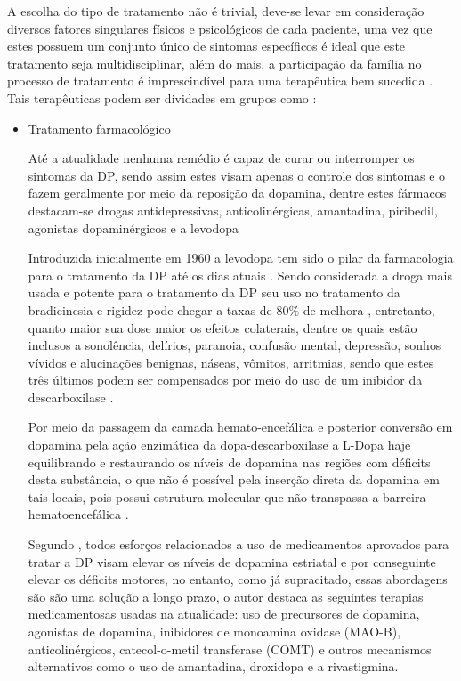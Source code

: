 \documentclass[
	12pt,				%
	openany,			%
	oneside,			%
	a4paper,			%
	english,			%
	french,				%
	spanish,			%
	brazil				%
	]{abntex2}
\begin{document}
A escolha do tipo de tratamento não é trivial, deve-se levar em consideração diversos fatores singulares físicos e psicológicos de cada paciente, uma vez que estes possuem um conjunto único de sintomas específicos é ideal que este tratamento seja multidisciplinar, além do mais, a participação da família no processo de tratamento é imprescindível para uma terapêutica bem sucedida \cite{saito2011}. Tais terapêuticas podem ser dividades em grupos como \cite{coelho2011, levine2003}: 


\begin{itemize}
	\item Tratamento farmacológico	
	
Até a atualidade nenhuma remédio é capaz de curar ou interromper os sintomas da DP, sendo assim estes visam apenas o controle dos sintomas e o fazem geralmente por meio da reposição da dopamina, dentre estes fármacos destacam-se drogas antidepressivas, anticolinérgicas, amantadina, piribedil, agonistas dopaminérgicos e a levodopa 
	
Introduzida inicialmente em 1960 a levodopa tem sido o pilar da farmacologia para o tratamento da DP até os dias atuais \cite{levine2003}. Sendo considerada a droga mais usada e potente para o tratamento da DP seu uso no tratamento da bradicinesia e rigidez pode chegar a taxas de 80\% de melhora \cite{saito2011}, entretanto, quanto maior sua dose maior os efeitos colaterais, dentre os quais estão inclusos a sonolência, delírios, paranoia, confusão mental, depressão, sonhos vívidos e alucinações benignas, náseas, vômitos, arritmias, sendo que estes três últimos podem ser compensados por meio do uso de um inibidor da descarboxilase \cite{moreira2007, saito2011}. 

Por meio da passagem da camada hemato-encefálica e posterior conversão em dopamina pela ação enzimática da dopa-descarboxilase a L-Dopa haje equilibrando e restaurando os níveis de dopamina nas regiões com déficits desta substância, o que não é possível pela inserção direta da dopamina em tais locais, pois possui estrutura molecular que não transpassa a barreira hematoencefálica \cite{coelho2011}.

Segundo , todos esforços relacionados a uso de medicamentos aprovados para tratar a DP visam elevar os níveis de dopamina estriatal e por conseguinte elevar os déficits motores, no entanto, como já supracitado, essas abordagens são são uma solução a longo prazo, o autor destaca as seguintes terapias medicamentosas usadas na atualidade: uso de precursores de dopamina, agonistas de dopamina, inibidores de monoamina oxidase (MAO-B), anticolinérgicos, catecol-o-metil transferase (COMT) e outros mecanismos alternativos como o uso de amantadina, droxidopa e a rivastigmina.

\end{itemize}
\end{document}

